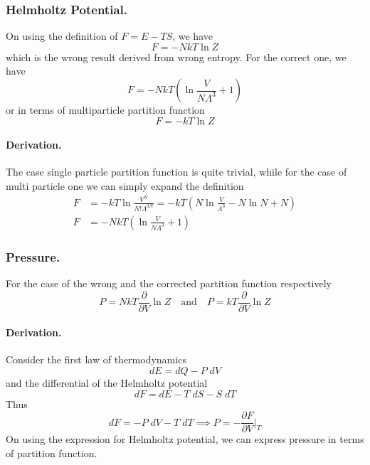 \documentclass[../../../Main.tex]{subfiles}
\begin{document}
\subsubsection{Helmholtz Potential.} On using the definition of $F=E-TS$, we have
\begin{equation*}
	F=-NkT\ln Z
\end{equation*}
which is the wrong result derived from wrong entropy. For the correct one, we have
\begin{equation*}
	F=-NkT\left(\ln \frac{V}{N\Lambda^3}+1\right)
\end{equation*}
or in terms of multiparticle partition function
\begin{equation*}
	F=-kT\ln Z
\end{equation*}

\paragraph{Derivation.} The case single particle partition function is quite trivial, while for the case of multi particle one we can simply expand the definition
\begin{align*}
	F & =-kT\ln \frac{V^N}{N!\Lambda^{3N}}=-kT\left(N\ln\frac{V}{\Lambda^3}-N\ln N+N\right) \\
	F & =-NkT\left(\ln \frac{V}{N\Lambda^3}+1\right)
\end{align*}

\subsubsection{Pressure.} For the case of the wrong and the corrected partition function respectively
\begin{equation*}
	P=NkT\frac{\partial}{\partial V} \ln Z\quad\text{and}\quad P=kT\frac{\partial}{\partial V} \ln Z
\end{equation*}

\paragraph{Derivation.} Consider the first law of thermodynamics
\begin{equation*}
	dE=dQ-P\;dV
\end{equation*}
and the differential of the Helmholtz potential
\begin{equation*}
	dF=dE-T\;dS-S\;dT
\end{equation*}
Thus
\begin{equation*}
	dF=-P\;dV-T\;dT\implies P=-\frac{\partial F}{\partial V}\bigg|_{T}
\end{equation*}
On using the expression for Helmholtz potential, we can express pressure in terms of partition function.
\end{document}
